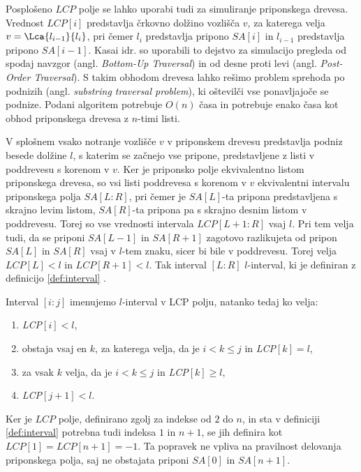 Posplošeno $LCP$ polje se lahko uporabi tudi za simuliranje priponskega drevesa. Vrednost $LCP[i]$ predstavlja črkovno dolžino vozlišča $v$, za katerega velja $v=\Lca{l_{i-1}}{l_i}$, pri čemer $l_i$ predstavlja pripono $SA[i]$ in $l_{i-1}$ predstavlja pripono $SA[i-1]$. Kasai idr. \cite{Kasai2001} so uporabili to dejstvo za simulacijo pregleda od spodaj navzgor (angl. \textit{Bottom-Up Traversal}) in od desne proti levi (angl. \textit{Post-Order Traversal}). S takim obhodom drevesa lahko rešimo problem sprehoda po podnizih (angl. \textit{substring traversal problem}), ki oštevilči vse ponavljajoče se podnize. Podani algoritem potrebuje $O(n)$ časa in potrebuje enako časa kot obhod priponskega drevesa z $n$-timi listi.

V splošnem vsako notranje vozlišče $v$ v priponskem drevesu predstavlja podniz besede dolžine $l$, s katerim se začnejo vse pripone, predstavljene z listi v poddrevesu s korenom v $v$. Ker je priponsko polje ekvivalentno listom priponskega drevesa, so vsi listi poddrevesa s korenom v $v$ ekvivalentni intervalu priponskega polja $SA[L:R]$, pri čemer je $SA[L]$-ta pripona predstavljena s skrajno levim listom, $SA[R]$-ta pripona pa s skrajno desnim listom v poddrevesu. Torej so vse vrednosti intervala $LCP[L+1:R]$ vsaj $l$. Pri tem velja tudi, da se priponi $SA[L-1]$ in $SA[R+1]$ zagotovo razlikujeta od pripon $SA[L]$ in $SA[R]$ vsaj v $l$-tem znaku, sicer bi bile v poddrevesu. Torej velja $LCP[L]< l$ in $LCP[R+1]< l$. Tak interval $[L:R]$ $l$-interval, ki je definiran z definicijo \ref{def:interval} \cite{Abouelhoda2004}.

\begin{defi}\label{def:interval}
    Interval $[i:j]$ imenujemo $l$-interval v LCP polju, natanko tedaj ko velja:
    \begin{enumerate}
        \item \textit{LCP}$[i]<l$,
        \item obstaja vsaj en $k$, za katerega velja, da je $i< k\le j$ in \textit{LCP}$[k]=l$,
        \item za vsak $k$ velja, da je $i< k\le j$ in \textit{LCP}$[k]\ge l$,
        \item \textit{LCP}$[j+1]<l$.      
    \end{enumerate}
\end{defi}

Ker je $LCP$ polje, definirano zgolj za indekse od $2$ do $n$, in sta v definiciji \ref{def:interval} potrebna tudi indeksa $1$ in $n+1$, se jih definira kot $LCP[1]=LCP[n+1]=-1$. Ta popravek ne vpliva na pravilnost delovanja priponskega polja, saj ne obstajata priponi $SA[0]$ in $SA[n+1]$. 

